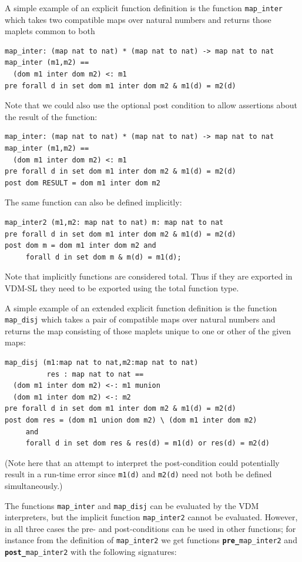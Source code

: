 \documentclass{overturerepchap}
\newcommand{\keyw}[1]{{\bf\ttfamily #1}}
\begin{document}
A simple example of an explicit function definition is the function
\texttt{map\_inter} which takes two compatible maps over natural
numbers and returns those maplets common to both
\begin{lstlisting}
map_inter: (map nat to nat) * (map nat to nat) -> map nat to nat
map_inter (m1,m2) ==
  (dom m1 inter dom m2) <: m1
pre forall d in set dom m1 inter dom m2 & m1(d) = m2(d)
\end{lstlisting}
Note that we could also use the optional post condition to allow
assertions about the result of the function:
\begin{lstlisting}
map_inter: (map nat to nat) * (map nat to nat) -> map nat to nat
map_inter (m1,m2) ==
  (dom m1 inter dom m2) <: m1
pre forall d in set dom m1 inter dom m2 & m1(d) = m2(d)
post dom RESULT = dom m1 inter dom m2
\end{lstlisting}

The same function can also be defined implicitly:
\begin{lstlisting}
map_inter2 (m1,m2: map nat to nat) m: map nat to nat
pre forall d in set dom m1 inter dom m2 & m1(d) = m2(d)
post dom m = dom m1 inter dom m2 and
     forall d in set dom m & m(d) = m1(d);
\end{lstlisting}
\noindent Note that implicitly functions are considered total. Thus if they are exported in VDM-SL they need to be exported using the total function type.
 
A simple example of an extended explicit function definition
is the function \texttt{map\_disj} which takes a pair of
compatible maps over natural numbers and returns the map consisting of
those maplets unique to one or other of the given maps:

\begin{lstlisting}
map_disj (m1:map nat to nat,m2:map nat to nat)
          res : map nat to nat ==
  (dom m1 inter dom m2) <-: m1 munion
  (dom m1 inter dom m2) <-: m2
pre forall d in set dom m1 inter dom m2 & m1(d) = m2(d)
post dom res = (dom m1 union dom m2) \ (dom m1 inter dom m2)
     and
     forall d in set dom res & res(d) = m1(d) or res(d) = m2(d)
\end{lstlisting}
\label{mapdisj}

(Note here that an attempt to interpret the post-condition could
potentially result in a run-time error since \texttt{m1(d)} and
\texttt{m2(d)} need not both be defined simultaneously.)

The functions {\tt map\_inter} and {\tt map\_disj} can be evaluated by the
VDM interpreters, but the implicit function {\tt map\_inter2} cannot be evaluated.
However, in all three cases the pre- and post-conditions can be used
in other functions; for instance from the definition of
\texttt{map\_inter2} we get functions \texttt{\keyw{pre\_}map\_inter2}
and \texttt{\keyw{post\_}map\_inter2} with the following signatures:
\end{document}
